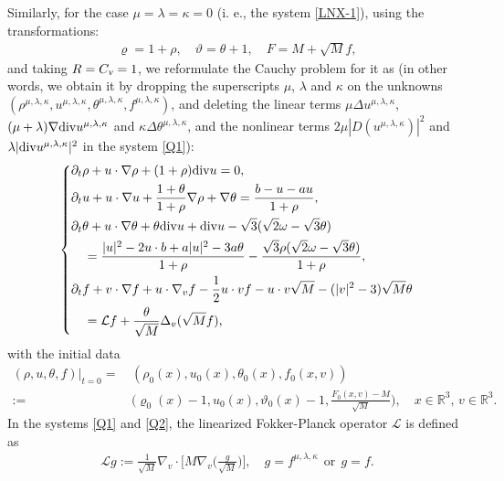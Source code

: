 \documentclass[reqno,11pt]{amsart}
\theoremstyle{plain}
\numberwithin{equation}{section}
\begin{document}
 
 Similarly, for the case $\mu=\lambda=\kappa=0$ (i. e.,  the system \eqref{LNX-1}), 
 using the transformations:   
\begin{align*}  
\varrho = 1 + \rho , \quad \vartheta  = \theta  + 1, \quad F = M + \sqrt{M}f,   
\end{align*}  
and taking $R = C_\textsl{v} = 1$,
we reformulate the Cauchy problem for it as  (in other words, we obtain 
it by   dropping  the {superscripts $\mu$, $\lambda$ and $\kappa$} on
 the unknowns $(\rho^{\mu,\lambda,\kappa}, u^{\mu,\lambda,\kappa},
  \theta^{\mu,\lambda,\kappa},  f^{\mu,\lambda,\kappa})$, and deleting 
{the linear terms $\mu  \Delta u^{\mu,\lambda,\kappa}$, $(\mu+\lambda)
  \nabla{\rm div} u^{\mu,\lambda,\kappa}$
and $\kappa \Delta \theta^{\mu,\lambda,\kappa}$,
and the nonlinear terms $2\mu |D(u^{\mu,\lambda,\kappa})|^2$ and
$\lambda |{\rm div}u^{\mu,\lambda,\kappa}|^2$
in the system \eqref{Q1}):}
\begin{equation}\label{Q2}
\left\{\begin{aligned}
&\partial_t \rho + u\cdot\nabla\rho+(1+\rho){\rm div} u=0, \\
&\partial_t u +u \cdot \nabla u+\frac{1+\theta}{1+\rho} \nabla 
\rho+\nabla \theta=\frac{b-u-au}{1+\rho}, \\
&\partial_t \theta +u \cdot \nabla \theta+\theta  {\rm div} u
+ {\rm div} u-\sqrt{3}(\sqrt{2} \omega-\sqrt{3} \theta)  \\
&\quad =\frac{ |u|^2-2 u \cdot b+a|u|^2-3 a \theta }{1+\rho}  
 -\frac{\sqrt{3}\rho(\sqrt{2} \omega-\sqrt{3} \theta)}{1+\rho},\\
&\partial_t f +v \cdot \nabla f+u \cdot \nabla_v f-\frac{1}{2} u \cdot v f-
u \cdot v \sqrt{M}- (|v|^2-3 ) \sqrt{M} \theta  \\
&\quad =\mathcal{L} f+\frac{\theta}{\sqrt{M}} \Delta_v(\sqrt{M} f),\\
\end{aligned}\right.
\end{equation} 
with the initial data
\begin{align}\label{Q2-2}
(\rho ,u ,\theta ,f )|_{t=0}=&\,(\rho _0(x),u _0(x),\theta _0(x),f _0(x,v))\nonumber\\
:=&\,\Big( \varrho_0 (x)-1,u _0(x), {\vartheta} _0(x)-1,\frac{F _0(x,v)-M}{\sqrt{M}}\Big),
 \quad   x \in \mathbb{R}^3, \, v\in\mathbb{R}^3.  \quad
\end{align}
In the systems \eqref{Q1} and \eqref{Q2}, the linearized Fokker-Planck operator $\mathcal{L}$ is defined as  
\begin{align} \label{lglg}
\mathcal{L}g := \frac{1}{\sqrt{M}} \nabla_v \cdot \Big[ M \nabla_v \Big( \frac{g}{\sqrt{M}} \Big) \Big], 
\quad g=f^{\mu,\lambda,\kappa} \ \  \textrm{or}\ \ g=f.
\end{align}  
\end{document}
